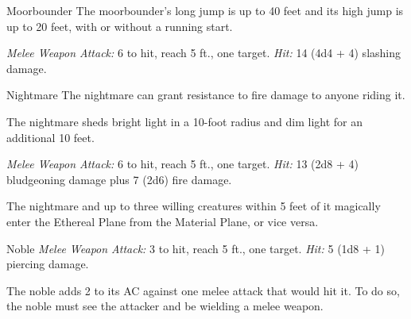 \documentclass[10pt,a4paper,twoside,bg=print,twocolumn,openany,nodeprecatedcode]{dndbook}
\begin{document}
\begin{DndMonster}[float=t]{Moorbounder}
\DndMonsterBasics[
armor-class = {13 (natural armor)},
hit-points = {\DndDice{4d10 + 8}},
speed = {70 ft.}
]
\DndMonsterAbilityScores[
 str = 18,
 dex = 14,
 con = 14,
 int = 2,
 wis = 13,
 cha = 5
]
\DndMonsterDetails[
senses = {darkvision 60 ft., passive perception 11},
challenge = 1,
]
The moorbounder's long jump is up to 40 feet and its high jump is up to 20 feet, with or without a running start.

\textsl{Melee Weapon Attack:} 6 to hit, reach 5 ft., one target. \textsl{Hit:} 14 (4d4 + 4) slashing damage.

\end{DndMonster}



\begin{DndMonster}[float=t]{Nightmare}
\DndMonsterBasics[
armor-class = {13 (natural armor)},
hit-points = {\DndDice{8d10 + 24}},
speed = {60 ft., fly 90 ft.}
]
\DndMonsterAbilityScores[
 str = 18,
 dex = 15,
 con = 16,
 int = 10,
 wis = 13,
 cha = 15
]
\DndMonsterDetails[
damage-immunities = {fire},
languages = {understands Abyssal, Common, and Infernal but can't speak },
challenge = 3,
]
The nightmare can grant resistance to fire damage to anyone riding it.

The nightmare sheds bright light in a 10-foot radius and dim light for an additional 10 feet.

\textsl{Melee Weapon Attack:} 6 to hit, reach 5 ft., one target. \textsl{Hit:} 13 (2d8 + 4) bludgeoning damage plus 7 (2d6) fire damage.

The nightmare and up to three willing creatures within 5 feet of it magically enter the Ethereal Plane from the Material Plane, or vice versa.

\end{DndMonster}



\begin{DndMonster}[float=t]{Noble}
\DndMonsterBasics[
armor-class = {15 (\textit{breastplate})},
hit-points = {\DndDice{2d8}},
speed = {30 ft.}
]
\DndMonsterAbilityScores[
 str = 11,
 dex = 12,
 con = 11,
 int = 12,
 wis = 14,
 cha = 16
]
\DndMonsterDetails[
skills = {Deception +5, Insight +4, Persuasion +5},
languages = {any two languages},
challenge = 1/8,
]
\textsl{Melee Weapon Attack:} 3 to hit, reach 5 ft., one target. \textsl{Hit:} 5 (1d8 + 1) piercing damage.

The noble adds 2 to its AC against one melee attack that would hit it. To do so, the noble must see the attacker and be wielding a melee weapon.

\end{DndMonster}
\end{document}
